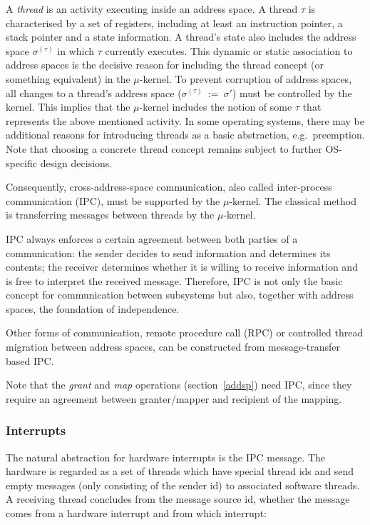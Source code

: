 \documentclass[a4paper,11pt,twoside,dvips]{book}
\newcommand{\micro}{$\mu$}
\begin{document}
A {\em thread} is an activity executing inside an address space. A thread
$\tau$ is
characterised by a set of registers, including at least an instruction
pointer, a stack pointer and a state information. A thread's state also
includes the address space $\sigma^{(\tau)}$ in
which $\tau$ currently executes. This dynamic or static association
to address spaces is the decisive reason for including the thread
concept (or something equivalent) in the \micro-kernel. To prevent
corruption of address spaces, all changes to a thread's address space
($\sigma^{(\tau)}\ :=\ \sigma'$) must be controlled by the kernel. This
implies that the \micro-kernel includes the notion of some $\tau$ that
represents the above mentioned activity. 
In some operating systems, there may be additional reasons for
introducing threads as a basic abstraction, e.g.\ preemption. 
Note that choosing a concrete thread concept
remains subject to further OS-specific design decisions. 
 
Consequently, cross-address-space communication, also called inter-process
communication (IPC), must be supported by the \micro-kernel. The classical
method is transferring messages between threads by the \micro-kernel. 
 
IPC always enforces a certain agreement between both parties of a
communication: the sender decides to send information and determines its
contents; the receiver determines whether it is willing to receive information
and is free to interpret the received message. Therefore, IPC is not only
the basic concept for communication between subsystems but also, together
with address spaces, the foundation of independence. 
 
Other forms of communication, remote procedure call (RPC) or controlled
thread migration between address spaces, can be constructed from
message-transfer based IPC. 
 
Note that the {\em grant} and {\em map} operations
(section~\ref{addsp}) need IPC, since
they require an agreement between granter/mapper and recipient of the
mapping.
 
 
 
 
 
\subsubsection*{Interrupts} 
 
The natural abstraction for hardware interrupts is the IPC message. The
hardware is regarded as a set of threads which have special thread ids
and send empty messages (only consisting of the sender id) to
associated software threads. A receiving thread concludes from the message
source id, whether the message comes from a hardware interrupt and from
which interrupt: 
 
\end{document}
